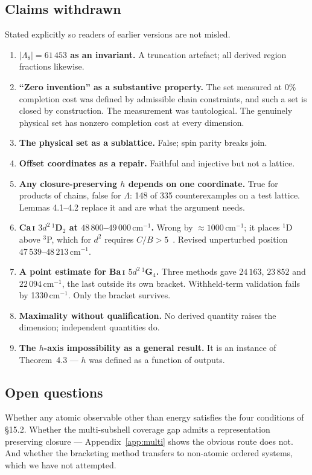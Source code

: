 \documentclass[11pt,a4paper]{article}
\theoremstyle{definition}
\newcommand{\Lm}{\ensuremath{\Lambda}}
\newcommand{\Le}{\ensuremath{\Lambda_{8}}}
\newcommand{\cmi}{\,\ensuremath{\mathrm{cm}^{-1}}}
\begin{document}
\subsection{Claims withdrawn}
\label{sec:withdrawn}
Stated explicitly so readers of earlier versions are not misled.
\begin{enumerate}[leftmargin=*,itemsep=1.5pt]
\item \textbf{$|\Le|=61\,453$ as an invariant.} A truncation artefact; all
derived region fractions likewise.
\item \textbf{``Zero invention'' as a substantive property.} The set measured at
0\% completion cost was defined by admissible chain constraints, and such a set
is closed by construction. The measurement was tautological. The genuinely
physical set has nonzero completion cost at every dimension.
\item \textbf{The physical set as a sublattice.} False; spin parity breaks join.
\item \textbf{Offset coordinates as a repair.} Faithful and injective but not a
lattice.
\item \textbf{Any closure-preserving $h$ depends on one coordinate.} True for
products of chains, false for \Lm{}: 148 of 335 counterexamples on a test
lattice. Lemmas 4.1--4.2 replace it and are what the argument needs.
\item \textbf{Ca\,\textsc{i} $3d^{2}\,^1$D$_2$ at $48\,800$--$49\,000$\cmi.}
Wrong by ${\approx}1000$\cmi; it places $^1$D above $^3$P, which for $d^{2}$
requires $C/B>5$~\cite{racah}. Revised unperturbed position
$47\,539$--$48\,213$\cmi.
\item \textbf{A point estimate for Ba\,\textsc{i} $5d^{2}\,^1$G$_4$.} Three
methods gave $24\,163$, $23\,852$ and $22\,094$\cmi, the last outside its own
bracket. Withheld-term validation fails by 1330\cmi. Only the bracket survives.
\item \textbf{Maximality without qualification.} No derived quantity raises the
dimension; independent quantities do.
\item \textbf{The $h$-axis impossibility as a general result.} It is an instance
of Theorem~4.3 --- $h$ was defined as a function of outputs.
\end{enumerate}

\subsection{Open questions}
Whether any atomic observable other than energy satisfies the four conditions of
\S15.2. Whether the multi-subshell coverage gap admits a representation
preserving closure --- Appendix~\ref{app:multi} shows the obvious route does
not. And whether the bracketing method transfers to non-atomic ordered systems,
which we have not attempted.
\end{document}
